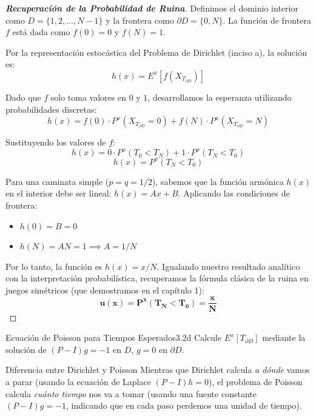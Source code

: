 \documentclass[10pt,a4paper]{article}
\begin{document}
\begin{proof}[\textbf{Recuperación de la Probabilidad de Ruina}]
    Definimos el dominio interior como $D = \{1, 2, \dots, N-1\}$ y la frontera como $\partial D = \{0, N\}$.
    La función de frontera $f$ está dada como $f(0) = 0$ y $f(N) = 1$.
    
    Por la representación estocástica del Problema de Dirichlet (inciso a), la solución es:
    \[ h(x) = E^x[f(X_{T_{\partial D}})] \]
    
    Dado que $f$ solo toma valores en $0$ y $1$, desarrollamos la esperanza utilizando probabilidades discretas:
    \[ h(x) = f(0) \cdot P^x(X_{T_{\partial D}} = 0) + f(N) \cdot P^x(X_{T_{\partial D}} = N) \]
    
    Sustituyendo los valores de $f$:
    \[ h(x) = 0 \cdot P^x(T_0 < T_N) + 1 \cdot P^x(T_N < T_0) \]
    \[ h(x) = P^x(T_N < T_0) \]
    
    Para una caminata simple ($p=q=1/2$), sabemos que la función armónica $h(x)$ en el interior debe ser lineal: $h(x) = Ax + B$.
    Aplicando las condiciones de frontera:
    \begin{itemize}
        \item $h(0) = B = 0$
        \item $h(N) = AN = 1 \implies A = 1/N$
    \end{itemize}
    Por lo tanto, la función es $h(x) = x/N$.
    Igualando nuestro resultado analítico con la interpretación probabilística, recuperamos la fórmula clásica de la ruina en juegos simétricos (que demostramos en el capítulo 1):
    \[ \mathbf{u(x) = P^x(T_N < T_0) = \frac{x}{N}} \]
\end{proof}

\newpage

\begin{ejercicio}{Ecuación de Poisson para Tiempos Esperados}{3.2d}
    Calcule $E^x[T_{\partial D}]$ mediante la solución de $(P - I)g = -1$ en $D$, $g = 0$ en $\partial D$.
\end{ejercicio}

\vspace{2mm}

\begin{nota}{Diferencia entre Dirichlet y Poisson}
    Mientras que Dirichlet calcula \textit{a dónde} vamos a parar (usando la ecuación de Laplace $(P-I)h = 0$), el problema de Poisson calcula \textit{cuánto tiempo} nos va a tomar (usando una fuente constante $(P-I)g = -1$, indicando que en cada paso perdemos una unidad de tiempo).
\end{nota}
\end{document}

